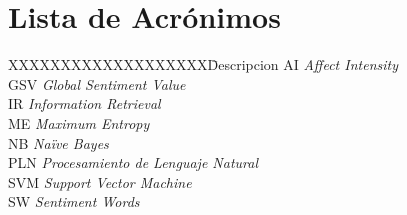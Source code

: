 \chapter*{Lista de Acr\'onimos}\label{acronimos}

\begin{tabbing}
XXXXXXXXXXXXXXXXXXX\=Descripcion\kill
AI \> {\it Affect Intensity }\\
GSV \> {\it Global Sentiment Value }\\
IR \> {\it Information Retrieval }\\
ME \> {\it Maximum Entropy}\\
NB \> {\it Na\"ive Bayes }\\
PLN \> {\it Procesamiento de Lenguaje Natural}\\
SVM \> {\it Support Vector Machine}\\
SW \> {\it Sentiment Words }\\
\end{tabbing}